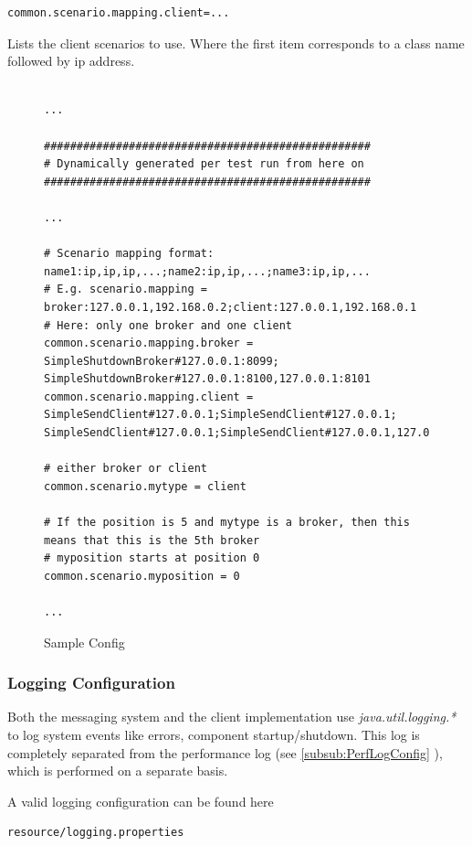 \documentclass[a4paper]{article}
\begin{document}
\begin{verbatim} 
common.scenario.mapping.client=...
\end{verbatim}
Lists the client scenarios to use. Where the first item corresponds to a class name followed by ip address.

\begin{figure}[H]
\begin{verbatim} 

...

##################################################
# Dynamically generated per test run from here on
##################################################

...

# Scenario mapping format: name1:ip,ip,ip,...;name2:ip,ip,...;name3:ip,ip,...
# E.g. scenario.mapping = broker:127.0.0.1,192.168.0.2;client:127.0.0.1,192.168.0.1
# Here: only one broker and one client
common.scenario.mapping.broker = SimpleShutdownBroker#127.0.0.1:8099;
SimpleShutdownBroker#127.0.0.1:8100,127.0.0.1:8101
common.scenario.mapping.client = SimpleSendClient#127.0.0.1;SimpleSendClient#127.0.0.1;
SimpleSendClient#127.0.0.1;SimpleSendClient#127.0.0.1,127.0.0.1

# either broker or client
common.scenario.mytype = client

# If the position is 5 and mytype is a broker, then this means that this is the 5th broker
# myposition starts at position 0
common.scenario.myposition = 0

...

\end{verbatim}
\caption{Sample Config}
\label{fig:SampleConfig}
\end{figure}  	

\subsubsection{Logging Configuration}
\label{subsub:loggingConfig}
Both the messaging system and the client implementation use \textit{java.util.logging.*} to log system events like errors, component startup/shutdown. This log is completely separated from the performance log (see \ref{subsub:PerfLogConfig} ), which is performed on a separate basis.

A valid logging configuration can be found here

\begin{verbatim} 
resource/logging.properties
\end{verbatim}
\end{document}
